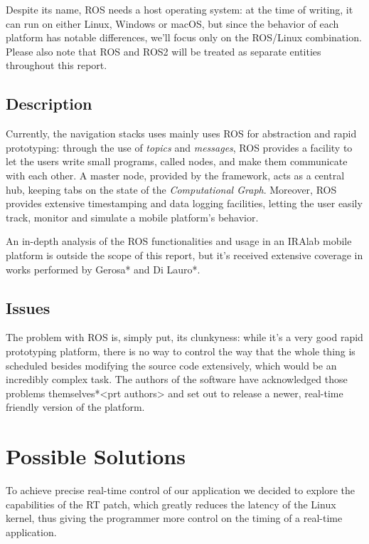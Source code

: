 \documentclass[a4paper,12pt]{report}
\begin{document}
Despite its name, ROS needs a host operating system: at the time of writing, it can run on either Linux, Windows or macOS, but since the behavior of each platform has notable differences, we'll focus only on the ROS/Linux combination. Please also note that ROS and ROS2 will be treated as separate entities throughout this report.

\subsection{Description}

Currently, the navigation stacks uses mainly uses ROS for abstraction and rapid prototyping: through the use of \textit{topics} and \textit{messages}, ROS provides a facility to let the users write small programs, called nodes, and make them communicate with each other. A master node, provided by the framework, acts as a central hub, keeping tabs on the state of the \textit{Computational Graph}. Moreover, ROS provides extensive timestamping and data logging facilities, letting the user easily track, monitor and simulate a mobile platform's behavior.

An in-depth analysis of the ROS functionalities and usage in an IRAlab mobile platform is outside the scope of this report, but it's received extensive coverage in works performed by Gerosa* and Di Lauro*.

\subsection{Issues}

The problem with ROS is, simply put, its clunkyness: while it's a very good rapid prototyping platform, there is no way to control the way that the whole thing is scheduled besides modifying the source code extensively, which would be an incredibly complex task. The authors of the software have acknowledged those problems themselves*<prt authors> and set out to release a newer, real-time friendly version of the platform.


\section{Possible Solutions}

To achieve precise real-time control of our application we decided to explore the capabilities of the RT patch, which greatly reduces the latency of the Linux kernel, thus giving the programmer more control on the timing of a real-time application.
\end{document}
